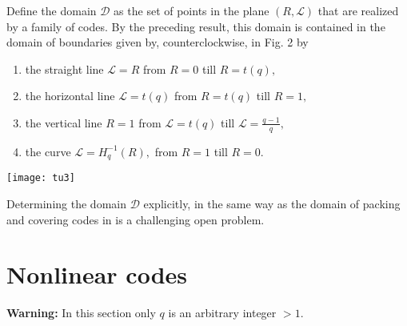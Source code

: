 \documentclass[12pt]{article}
\theoremstyle{definition}
\begin{document}
Define the domain $\mathcal D$ as the set of points in the plane $(R,\mathcal L)$ that are realized by a family of codes. By the preceding result, this domain is contained in the domain of
boundaries given by, counterclockwise, in Fig. 2 by
\begin{enumerate}
\item the straight line ${\mathcal L}=R$ from $R=0$ till $R=t(q),$
\item the horizontal line ${\mathcal L}=t(q)$ from $R=t(q)$ till $R=1,$
\item  the vertical line $R=1$ from ${\mathcal L}=t(q)$ till ${\mathcal L}=\frac{q-1}{q},$
\item the curve ${\mathcal L}=H_q^{-1}(R),$ from $R=1$ till $R=0.$
\end{enumerate}
\vskip 1mm
\begin{center}
\texttt{[image: tu3]}
\end{center}
\vskip 1mm
\vskip 0.0000001cm



Determining the domain $\mathcal D$ explicitly, in the same way as the domain of packing and covering codes in \cite{CHLS} is a challenging open problem.






\section{Nonlinear codes}
{\bf Warning:} In this section only $q$ is an arbitrary integer $>1.$
\end{document}
